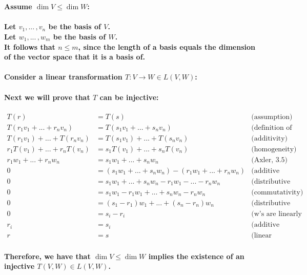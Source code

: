 \documentclass{article}
\begin{document}
\paragraph{\large
\\Assume $\dim V \leq \dim W$:
\\
\\Let $v_1,...\,,v_n$ be the basis of $V$.
\\Let $w_1,...\,,w_m$ be the basis of $W$.
\\It follows that $n \leq m$, since the length of a basis equals the dimension of the vector space that it is a basis of.}

\paragraph{\large
Consider a linear transformation $T: V \rightarrow W \in L(V, W)$:
\\
\\ Next we will prove that $T$ can be injective:}

\begin{align*}
    T(r) &= T(s) & \text{(assumption)}\\
    T(r_1v_1+...+r_nv_n) &= T(s_1v_1+...+s_nv_n) & \text{(definition of basis)}\\
    T(r_1v_1)+...+T(r_nv_n) &= T(s_1v_1)+...+T(s_nv_n) & \text{(additivity)}\\
    r_1T(v_1)+...+r_nT(v_n) &= s_1T(v_1)+...+s_nT(v_n) & \text{(homogeneity)}\\
    r_1w_1+...+r_nw_n &= s_1w_1+...+s_nw_n & \text{(Axler, 3.5)}\\
    0 &= (s_1w_1+...+s_nw_n) - (r_1w_1+...+r_nw_n) & \text{(additive inverse)}\\
    0 &= s_1w_1+...+s_nw_n - r_1w_1-...-r_nw_n & \text{(distributive property)}\\
    0 &= s_1w_1-r_1w_1+...+s_nw_n-r_nw_n & \text{(commutativity)}\\
    0 &= (s_1-r_1)w_1+...+(s_n-r_n)w_n & \text{(distributive property)}\\
    0 &= s_i-r_i & \text{(w's are linearly independent)}\\
    r_i &= s_i & \text{(additive inverse)}\\
    r &= s & \text{(linear combinations are equivalent)}
\end{align*}

\paragraph{\large
Therefore, we have that $\dim V \leq \dim W$ implies the existence of an injective $T(V, W) \in L(V, W)$.}
\end{document}
